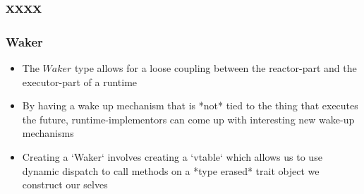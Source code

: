 \subsection{xxxx} %
\begin{frame}[fragile]
    \frametitle{Waker}
% 
% 
% 
% 
    \begin{itemize}
        \item The $Waker$ type allows for a loose coupling between the reactor-part and the executor-part of a runtime
        \item By having a wake up mechanism that is *not* tied to the thing that executes the future, runtime-implementors can come up with interesting new wake-up mechanisms
        \item Creating a `Waker` involves creating a `vtable` which allows us to use dynamic dispatch to call methods on a *type erased* trait object we construct our selves
    \end{itemize}

\end{frame}
